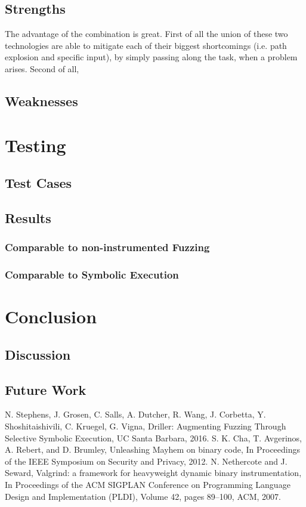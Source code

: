 \documentclass[a4paper]{article}
\begin{document}
\subsection{Strengths}
The advantage of the combination is great. First of all the union of these two technologies are able to mitigate each of their biggest shortcomings (i.e. path explosion and specific input), by simply passing along the task, when a problem arises. Second of all, 
\subsection{Weaknesses}

\section{Testing}
\subsection{Test Cases}
\subsection{Results}
\subsubsection*{Comparable to non-instrumented Fuzzing}
\subsubsection*{Comparable to Symbolic Execution}



\section{Conclusion}
\subsection{Discussion}
\subsection{Future Work}
\begin{thebibliography}{9}
	N. Stephens, J. Grosen, C. Salls, A. Dutcher, R. Wang, J. Corbetta, Y. Shoshitaishivili, C. Kruegel, G.  Vigna,
	Driller: Augmenting Fuzzing Through Selective Symbolic Execution,
	UC Santa Barbara,
	2016.
	S. K. Cha, T. Avgerinos, A. Rebert, and D. Brumley,
	Unleashing Mayhem on binary code,
	In Proceedings of the IEEE Symposium on Security and Privacy,
	2012.
	N. Nethercote and J. Seward,
	Valgrind: a framework for heavyweight dynamic binary instrumentation, 
	In Proceedings of the ACM SIGPLAN Conference on Programming Language Design and Implementation (PLDI),
	Volume 42,
	pages 89–100, 
	ACM,
	2007.
\end{thebibliography}

\end{document}
